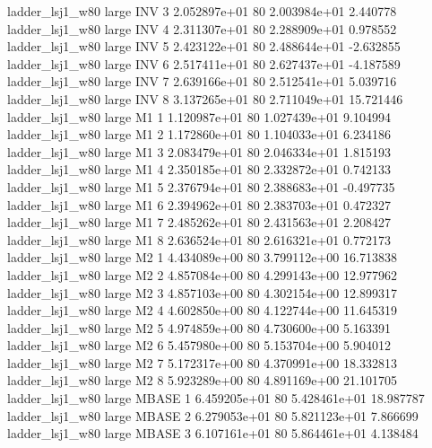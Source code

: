     ladder_lsj1_w80      large      INV                 3 2.052897e+01 80   2.003984e+01           2.440778
    ladder_lsj1_w80      large      INV                 4 2.311307e+01 80   2.288909e+01           0.978552
    ladder_lsj1_w80      large      INV                 5 2.423122e+01 80   2.488644e+01          -2.632855
    ladder_lsj1_w80      large      INV                 6 2.517411e+01 80   2.627437e+01          -4.187589
    ladder_lsj1_w80      large      INV                 7 2.639166e+01 80   2.512541e+01           5.039716
    ladder_lsj1_w80      large      INV                 8 3.137265e+01 80   2.711049e+01          15.721446
    ladder_lsj1_w80      large       M1                 1 1.120987e+01 80   1.027439e+01           9.104994
    ladder_lsj1_w80      large       M1                 2 1.172860e+01 80   1.104033e+01           6.234186
    ladder_lsj1_w80      large       M1                 3 2.083479e+01 80   2.046334e+01           1.815193
    ladder_lsj1_w80      large       M1                 4 2.350185e+01 80   2.332872e+01           0.742133
    ladder_lsj1_w80      large       M1                 5 2.376794e+01 80   2.388683e+01          -0.497735
    ladder_lsj1_w80      large       M1                 6 2.394962e+01 80   2.383703e+01           0.472327
    ladder_lsj1_w80      large       M1                 7 2.485262e+01 80   2.431563e+01           2.208427
    ladder_lsj1_w80      large       M1                 8 2.636524e+01 80   2.616321e+01           0.772173
    ladder_lsj1_w80      large       M2                 1 4.434089e+00 80   3.799112e+00          16.713838
    ladder_lsj1_w80      large       M2                 2 4.857084e+00 80   4.299143e+00          12.977962
    ladder_lsj1_w80      large       M2                 3 4.857103e+00 80   4.302154e+00          12.899317
    ladder_lsj1_w80      large       M2                 4 4.602850e+00 80   4.122744e+00          11.645319
    ladder_lsj1_w80      large       M2                 5 4.974859e+00 80   4.730600e+00           5.163391
    ladder_lsj1_w80      large       M2                 6 5.457980e+00 80   5.153704e+00           5.904012
    ladder_lsj1_w80      large       M2                 7 5.172317e+00 80   4.370991e+00          18.332813
    ladder_lsj1_w80      large       M2                 8 5.923289e+00 80   4.891169e+00          21.101705
    ladder_lsj1_w80      large    MBASE                 1 6.459205e+01 80   5.428461e+01          18.987787
    ladder_lsj1_w80      large    MBASE                 2 6.279053e+01 80   5.821123e+01           7.866699
    ladder_lsj1_w80      large    MBASE                 3 6.107161e+01 80   5.864461e+01           4.138484
